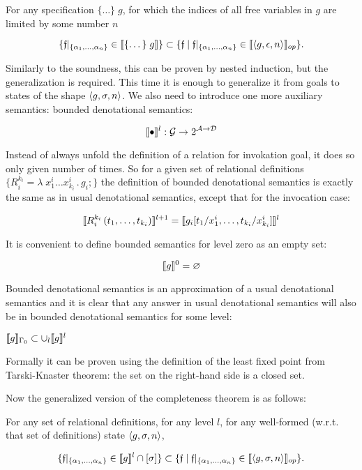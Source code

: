 \begin{theorem}
For any specification $\{\dots\}\; g$, for which the indices of all free variables in $g$ are limited by some number $n$

\[
\{\mathfrak{f}|_{\{\alpha_1,\dots,\alpha_n\}} \in \llbracket{\{\dots\}\; g}\rrbracket\} \subset \{\mathfrak{f} \mid \mathfrak{f}|_{\{\alpha_1,\dots,\alpha_n\}} \in \llbracket{\left<{g, \epsilon, n}\right>}\rrbracket_{op}\}.
\]
\end{theorem}


Similarly to the soundness, this can be proven by nested induction, but the generalization is required. This time it is enough to generalize it from goals
to states of the shape $\left<{g, \sigma, n}\right>$. We also need to introduce one more auxiliary semantics: bounded denotational semantics:

\[
\llbracket{\bullet}\rrbracket^l : \mathcal{G} \to 2^{\mathcal{A}\to\mathcal{D}}
\]

Instead of always unfold the definition of a relation for invokation goal, it does so only given number of times. So for a given set of relational
definitions $\{R_i^{k_i} = \lambda\;x_1^i\dots x_{k_i}^i\,.\, g_i;\}$ the definition of bounded denotational semantics is exactly the same as in usual denotational semantics,
except that for the invocation case:

\[
\llbracket{R_i^{k_i}\,(t_1,\dots,t_{k_i})}\rrbracket^{l+1} = \llbracket{g_i[t_1/x_1^i, \dots, t_{k_i}/x_{k_i}^i]}\rrbracket^{l}
\]

It is convenient to define bounded semantics for level zero as an empty set:

\[
\llbracket{g}\rrbracket^{0} = \varnothing
\]

Bounded denotational semantics is an approximation of a usual denotational semantics and it is clear that any answer in usual denotational semantics will also be in
bounded denotational semantics for some level:

\begin{lemma}
$\llbracket{g}\rrbracket_{\Gamma_0} \subset \cup_l \llbracket{g}\rrbracket^l$
\end{lemma}

Formally it can be proven using the definition of the least fixed point from Tarski-Knaster theorem: the set on the right-hand side is a closed set.

Now the generalized version of the completeness theorem is as follows:

\begin{lemma}
For any set of relational definitions, for any level $l$, for any well-formed (w.r.t. that set of definitions) state $\left<{g, \sigma, n}\right>$,

\[
\{\mathfrak{f}|_{\{\alpha_1,\dots,\alpha_n\}} \in \llbracket{g}\rrbracket^l \cap [\sigma]\} \subset \{\mathfrak{f} \mid \mathfrak{f}|_{\{\alpha_1,\dots,\alpha_n\}} \in \llbracket{\left<{g, \sigma, n}\right>}\rrbracket_{op}\}.
\]
\end{lemma}

